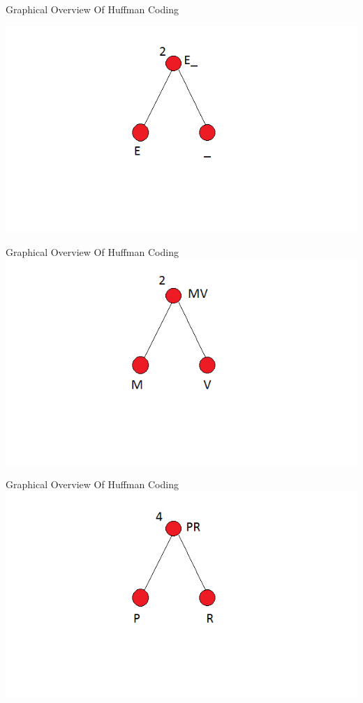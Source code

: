 \documentclass[12pt]{beamer}
\begin{document}
\begin{frame}{Graphical Overview Of Huffman Coding}

\pause
\includegraphics[scale=0.6]{1}
\end{frame}


\begin{frame}{Graphical Overview Of Huffman Coding}
\includegraphics[scale=0.6]{2}
\end{frame}


\begin{frame}{Graphical Overview Of Huffman Coding}
\includegraphics[scale=0.6]{3}
\end{frame}
\end{document}

